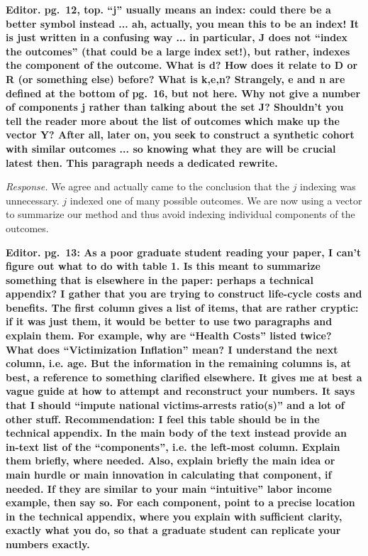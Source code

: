 \noindent \textbf{Editor. pg.\ 12, top. ``j'' usually means an index: could there be a better symbol instead ... ah, actually, you mean this to be an index! It is just written in a confusing way ... in particular, J does not ``index the outcomes'' (that could be a large index set!), but rather, indexes the component of the outcome. What is d? How does it relate to D or R (or something else) before? What is k,e,n? Strangely, e and n are defined at the bottom of pg.\ 16, but not here. Why not give a number of components j rather than talking about the set J? Shouldn't you tell the reader more about the list of outcomes which make up the vector Y? After all, later on, you seek to construct a synthetic cohort with similar outcomes ... so knowing what they are will be crucial latest then. This paragraph needs a dedicated rewrite.}

\noindent \textit{Response.} We agree and actually came to the conclusion that the $j$ indexing was unnecessary. $j$ indexed one of many possible outcomes. We are now using a vector to summarize our method and thus avoid indexing individual components of the outcomes.

\noindent \textbf{Editor. pg.\ 13: As a poor graduate student reading your paper, I can't figure out what to do with table 1. Is this meant to summarize something that is elsewhere in the paper: perhaps a technical appendix? I gather that you are trying to construct life-cycle costs and benefits. The first column gives a list of items, that are rather cryptic: if it was just them, it would be better to use two paragraphs and explain them. For example, why are ``Health Costs'' listed twice? What does ``Victimization Inflation'' mean? I understand the next column, i.e. age. But the information in the remaining columns is, at best, a reference to something clarified elsewhere. It gives me at best a vague guide at how to attempt and reconstruct your numbers. It says that I should ``impute national victims-arrests ratio(s)'' and a lot of other stuff. Recommendation: I feel this table should be in the technical appendix. In the main body of the text instead provide an in-text list of the ``components'', i.e. the left-most column. Explain them briefly, where needed. Also, explain briefly the main idea or main hurdle or main innovation in calculating that component, if needed. If they are similar to your main ``intuitive'' labor income example, then say so. For each component, point to a precise location in the technical appendix, where you explain with sufficient clarity, exactly what you do, so that a graduate student can replicate your numbers exactly.}


